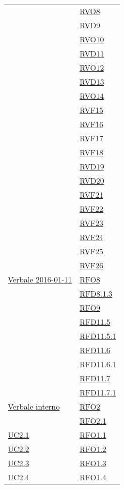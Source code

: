 \begin{longtable}{|>{\centering}m{5cm}|m{5cm}<{\centering}|}
& \hyperlink{RVO8}{RVO8}\\
& \hyperlink{RVD9}{RVD9}\\
& \hyperlink{RVO10}{RVO10}\\
& \hyperlink{RVD11}{RVD11}\\
& \hyperlink{RVO12}{RVO12}\\
& \hyperlink{RVD13}{RVD13}\\
& \hyperlink{RVO14}{RVO14}\\
& \hyperlink{RVF15}{RVF15}\\
& \hyperlink{RVF16}{RVF16}\\
& \hyperlink{RVF17}{RVF17}\\
& \hyperlink{RVF18}{RVF18}\\
& \hyperlink{RVD19}{RVD19}\\
& \hyperlink{RVD20}{RVD20}\\
& \hyperlink{RVF21}{RVF21}\\
& \hyperlink{RVF22}{RVF22}\\
& \hyperlink{RVF23}{RVF23}\\
& \hyperlink{RVF24}{RVF24}\\
& \hyperlink{RVF25}{RVF25}\\
& \hyperlink{RVF26}{RVF26}\\ \hline
\hyperlink{Verbale 2016-01-11}{Verbale 2016-01-11} & \hyperlink{RFO8}{RFO8}\\
& \hyperlink{RFD8.1.3}{RFD8.1.3}\\
& \hyperlink{RFO9}{RFO9}\\
& \hyperlink{RFD11.5}{RFD11.5}\\
& \hyperlink{RFD11.5.1}{RFD11.5.1}\\
& \hyperlink{RFD11.6}{RFD11.6}\\
& \hyperlink{RFD11.6.1}{RFD11.6.1}\\
& \hyperlink{RFD11.7}{RFD11.7}\\
& \hyperlink{RFD11.7.1}{RFD11.7.1}\\ \hline
\hyperlink{Verbale interno}{Verbale interno} & \hyperlink{RFO2}{RFO2}\\
& \hyperlink{RFO2.1}{RFO2.1}\\ \hline
\hyperref[UC2.1]{UC2.1} & \hyperlink{RFO1.1}{RFO1.1}\\ \hline
\hyperref[UC2.2]{UC2.2} & \hyperlink{RFO1.2}{RFO1.2}\\ \hline
\hyperref[UC2.3]{UC2.3} & \hyperlink{RFO1.3}{RFO1.3}\\ \hline
\hyperref[UC2.4]{UC2.4} & \hyperlink{RFO1.4}{RFO1.4}\\ \hline

\end{longtable}
